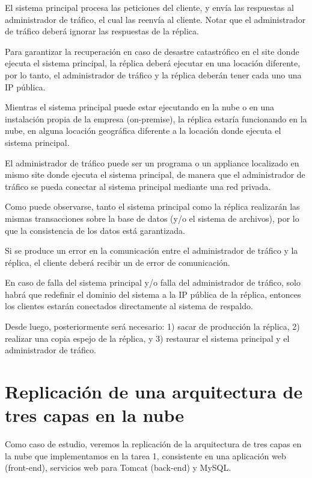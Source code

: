 El sistema principal procesa las peticiones del cliente, y envía las respuestas al administrador de tráfico, el cual las reenvía al cliente. Notar que el administrador de tráfico deberá ignorar las respuestas de la réplica.

Para garantizar la recuperación en caso de desastre catastrófico en el site donde ejecuta el sistema principal, la réplica deberá ejecutar en una locación diferente, por lo tanto, el administrador de tráfico y la réplica deberán tener cada uno una IP pública.

Mientras el sistema principal puede estar ejecutando en la nube o en una instalación propia de la empresa (on-premise), la réplica estaría funcionando en la nube, en alguna locación geográfica diferente a la locación donde ejecuta el sistema principal.

El administrador de tráfico puede ser un programa o un appliance localizado en mismo site donde ejecuta el sistema principal, de manera que el administrador de tráfico se pueda conectar al sistema principal mediante una red privada.

Como puede observarse, tanto el sistema principal como la réplica realizarán las mismas transacciones sobre la base de datos (y/o el sistema de archivos), por lo que la consistencia de los datos está garantizada.

Si se produce un error en la comunicación entre el administrador de tráfico y la réplica, el cliente deberá recibir un de error de comunicación.

En caso de falla del sistema principal y/o falla del administrador de tráfico, solo habrá que redefinir el dominio del sistema a la IP pública de la réplica, entonces los clientes estarán conectados directamente al sistema de respaldo.

Desde luego, posteriormente será necesario: 1) sacar de producción la réplica, 2) realizar una copia espejo de la réplica, y 3) restaurar el sistema principal y el administrador de tráfico.

\section{Replicación de una arquitectura de tres capas en la nube}

Como caso de estudio, veremos la replicación de la arquitectura de tres capas en la nube que implementamos en la tarea 1, consistente en una aplicación web (front-end), servicios web para Tomcat (back-end) y MySQL.

